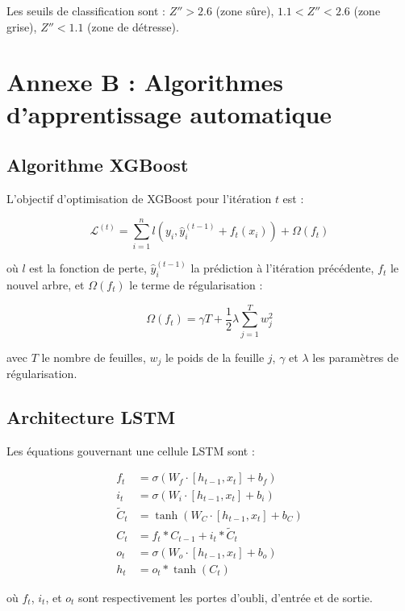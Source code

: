 Les seuils de classification sont : $Z'' > 2.6$ (zone sûre), $1.1 < Z'' < 2.6$ (zone grise), $Z'' < 1.1$ (zone de détresse).

\section{Annexe B : Algorithmes d'apprentissage automatique}

\subsection{Algorithme XGBoost}

L'objectif d'optimisation de XGBoost pour l'itération $t$ est :

\begin{equation}
\mathcal{L}^{(t)} = \sum_{i=1}^n l(y_i, \hat{y}_i^{(t-1)} + f_t(x_i)) + \Omega(f_t)
\end{equation}

où $l$ est la fonction de perte, $\hat{y}_i^{(t-1)}$ la prédiction à l'itération précédente, $f_t$ le nouvel arbre, et $\Omega(f_t)$ le terme de régularisation :

\begin{equation}
\Omega(f_t) = \gamma T + \frac{1}{2}\lambda \sum_{j=1}^T w_j^2
\end{equation}

avec $T$ le nombre de feuilles, $w_j$ le poids de la feuille $j$, $\gamma$ et $\lambda$ les paramètres de régularisation.

\subsection{Architecture LSTM}

Les équations gouvernant une cellule LSTM sont :

\begin{align}
f_t &= \sigma(W_f \cdot [h_{t-1}, x_t] + b_f) \\
i_t &= \sigma(W_i \cdot [h_{t-1}, x_t] + b_i) \\
\tilde{C}_t &= \tanh(W_C \cdot [h_{t-1}, x_t] + b_C) \\
C_t &= f_t * C_{t-1} + i_t * \tilde{C}_t \\
o_t &= \sigma(W_o \cdot [h_{t-1}, x_t] + b_o) \\
h_t &= o_t * \tanh(C_t)
\end{align}

où $f_t$, $i_t$, et $o_t$ sont respectivement les portes d'oubli, d'entrée et de sortie.

